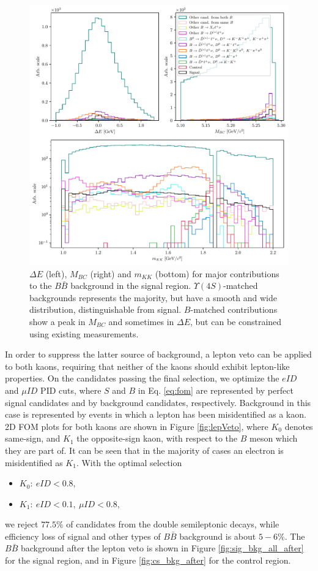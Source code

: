 \begin{figure}[H]
	\centering
	\captionsetup{width=0.8\linewidth}
	\includegraphics[width=\linewidth]{fig/sig_BKG_composition_all_before.pdf}
	\caption{$\Delta E$ (left), $M_{BC}$ (right) and $m_{KK}$ (bottom) for major contributions to the $B \bar B$ background in the signal region. $\Upsilon(4S)$-matched backgrounds represents the majority, but have a smooth and wide distribution, distinguishable from signal. $B$-matched contributions show a peak in $M_{BC}$ and sometimes in $\Delta E$, but can be constrained using existing measurements.}
	\label{fig:sig_bkg_all_before}
\end{figure} 

In order to suppress the latter source of background, a lepton veto can be applied to both kaons, requiring that neither of the kaons should exhibit lepton-like properties. On the candidates passing the final selection, we optimize the $eID$ and $\mu ID$ PID cuts, where $S$ and $B$ in Eq. \ref{eq:fom} are represented by perfect signal candidates and by background candidates, respectively. Background in this case is represented by events in which a lepton has been misidentified as a kaon. 2D FOM plots for both kaons are shown in Figure \ref{fig:lepVeto}, where $K_0$ denotes same-sign, and $K_1$ the opposite-sign kaon, with respect to the $B$ meson which they are part of. It can be seen that in the majority of cases an electron is misidentified as $K_1$. With the optimal selection 
\begin{itemize}
	\item $K_0:~eID < 0.8,$
	\item $K_1:~eID < 0.1,~\mu ID < 0.8,$
\end{itemize}
we reject $77.5\%$ of candidates from the double semileptonic decays, while efficiency loss of signal and other types of $B \bar B$ background is about $5-6\%$. The $B \bar B$ background after the lepton veto is shown in Figure \ref{fig:sig_bkg_all_after} for the signal region, and in Figure \ref{fig:cs_bkg_after} for the control region.

